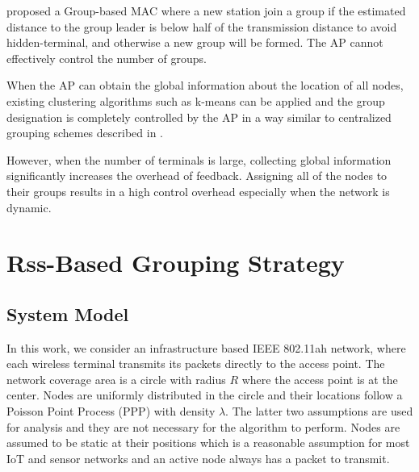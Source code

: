 \cite{abichar2013group} proposed a Group-based MAC where a new station join a group if the estimated distance to the group leader is below half of the transmission distance to avoid hidden-terminal, and otherwise a new group will be formed. The AP cannot effectively control the number of groups.

When the AP can obtain the global information about the location of all nodes, existing clustering algorithms such as k-means can be applied and the group designation is completely controlled by the AP in a way similar to centralized grouping schemes described in \cite{zheng2014performance}.

However, when the number of terminals is large, collecting global information significantly increases the overhead of feedback. Assigning all of the nodes to their groups results in a high control overhead especially when the network is dynamic.

\section{Rss-Based Grouping Strategy}


\subsection{System Model} \label{single:systemmodel}

In this work, we consider an infrastructure based IEEE 802.11ah network, where each wireless terminal transmits its packets directly to the access point. %
The network coverage area is a circle with radius $R$ where the access point is at the center. Nodes are uniformly distributed in the circle and their locations follow a Poisson Point Process (PPP) with density $\lambda$. The latter two assumptions are used for analysis and they are not necessary for the algorithm to perform. Nodes are assumed to be static at their positions which is a reasonable assumption for most IoT and sensor networks and an active node always has a packet to transmit. %


